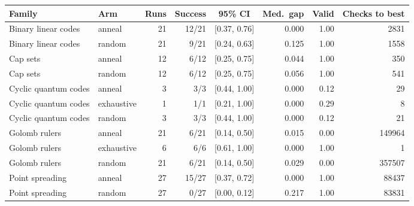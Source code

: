 \begin{tabular}{llrrcrrr}
\toprule
Family & Arm & Runs & Success & 95\% CI & Med.\ gap & Valid & Checks to best\\
\midrule
Binary linear codes & anneal & 21 & 12/21 & [0.37, 0.76] & 0.000 & 1.00 & 2831\\
Binary linear codes & random & 21 & 9/21 & [0.24, 0.63] & 0.125 & 1.00 & 1558\\
Cap sets & anneal & 12 & 6/12 & [0.25, 0.75] & 0.044 & 1.00 & 350\\
Cap sets & random & 12 & 6/12 & [0.25, 0.75] & 0.056 & 1.00 & 541\\
Cyclic quantum codes & anneal & 3 & 3/3 & [0.44, 1.00] & 0.000 & 0.12 & 29\\
Cyclic quantum codes & exhaustive & 1 & 1/1 & [0.21, 1.00] & 0.000 & 0.29 & 8\\
Cyclic quantum codes & random & 3 & 3/3 & [0.44, 1.00] & 0.000 & 0.12 & 21\\
Golomb rulers & anneal & 21 & 6/21 & [0.14, 0.50] & 0.015 & 0.00 & 149964\\
Golomb rulers & exhaustive & 6 & 6/6 & [0.61, 1.00] & 0.000 & 1.00 & 1\\
Golomb rulers & random & 21 & 6/21 & [0.14, 0.50] & 0.029 & 0.00 & 357507\\
Point spreading & anneal & 27 & 15/27 & [0.37, 0.72] & 0.000 & 1.00 & 88437\\
Point spreading & random & 27 & 0/27 & [0.00, 0.12] & 0.217 & 1.00 & 83831\\
\bottomrule
\end{tabular}
